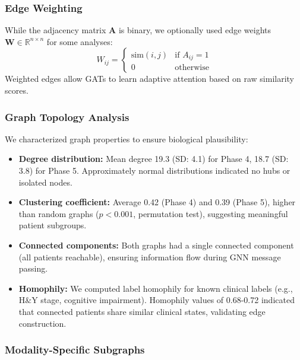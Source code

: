 \subsubsection{Edge Weighting}

While the adjacency matrix $\mathbf{A}$ is binary, we optionally used edge weights $\mathbf{W} \in \mathbb{R}^{n \times n}$ for some analyses:
\begin{equation}
    W_{ij} = \begin{cases}
        \text{sim}(i, j) & \text{if } A_{ij} = 1 \\
        0 & \text{otherwise}
    \end{cases}
\end{equation}
Weighted edges allow GATs to learn adaptive attention based on raw similarity scores.

\subsubsection{Graph Topology Analysis}

We characterized graph properties to ensure biological plausibility:

\begin{itemize}
    \item \textbf{Degree distribution:} Mean degree 19.3 (SD: 4.1) for Phase 4, 18.7 (SD: 3.8) for Phase 5. Approximately normal distributions indicated no hubs or isolated nodes.
    
    \item \textbf{Clustering coefficient:} Average 0.42 (Phase 4) and 0.39 (Phase 5), higher than random graphs ($p < 0.001$, permutation test), suggesting meaningful patient subgroups.
    
    \item \textbf{Connected components:} Both graphs had a single connected component (all patients reachable), ensuring information flow during GNN message passing.
    
    \item \textbf{Homophily:} We computed label homophily\cite{zhu2020beyond} for known clinical labels (e.g., H\&Y stage, cognitive impairment). Homophily values of 0.68-0.72 indicated that connected patients share similar clinical states, validating edge construction.
\end{itemize}

\subsubsection{Modality-Specific Subgraphs}

